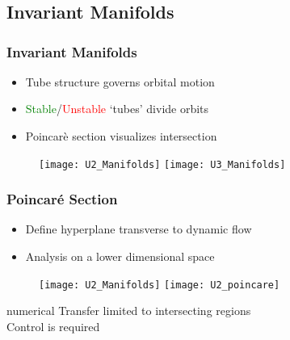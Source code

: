 \section*{}
\subsection*{Invariant Manifolds}

\begin{frame}%
\frametitle{Invariant Manifolds}
\begin{itemize}
	\item Tube structure governs orbital motion
	\item \textcolor{green}{Stable}/\textcolor{red}{Unstable} `tubes' divide orbits
	\item Poincar\`e section visualizes intersection
\end{itemize}
 \begin{figure}
     \centering
     \texttt{[image: U2\_Manifolds]}%
     \texttt{[image: U3\_Manifolds]}
\end{figure}
\end{frame}%

\begin{frame}[t]%
\frametitle{Poincar\'e Section}
	\begin{itemize}
		\item Define hyperplane transverse to dynamic flow
		\item Analysis on a lower dimensional space
	\end{itemize}
 \begin{figure}
     \centering
     \texttt{[image: U2\_Manifolds]}%
     \texttt{[image: U2\_poincare]}
\end{figure}

	\pause
	\begin{beamercolorbox}[sep=0.2cm,center]{numerical}
		Transfer limited to intersecting regions \\
		Control is required 
	\end{beamercolorbox}
\end{frame}%

